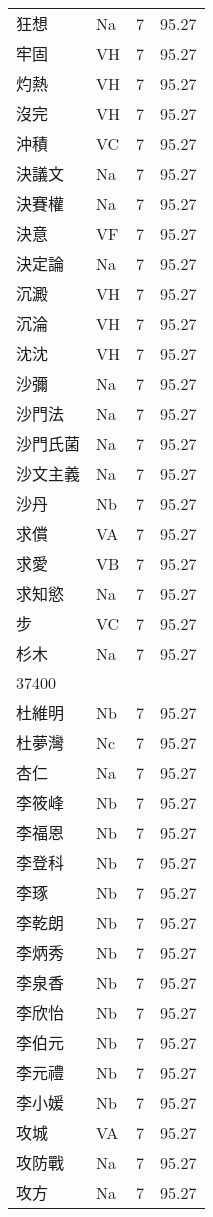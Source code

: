 \documentclass[twocolumn]{book}
\begin{document}
\begin{supertabular}{llrr}
狂想 & Na & 7 &  95.27\\
牢固 & VH & 7 &  95.27\\
灼熱 & VH & 7 &  95.27\\
沒完 & VH & 7 &  95.27\\
沖積 & VC & 7 &  95.27\\
決議文 & Na & 7 &  95.27\\
決賽權 & Na & 7 &  95.27\\
決意 & VF & 7 &  95.27\\
決定論 & Na & 7 &  95.27\\
沉澱 & VH & 7 &  95.27\\
沉淪 & VH & 7 &  95.27\\
沈沈 & VH & 7 &  95.27\\
沙彌 & Na & 7 &  95.27\\
沙門法 & Na & 7 &  95.27\\
沙門氏菌 & Na & 7 &  95.27\\
沙文主義 & Na & 7 &  95.27\\
沙丹 & Nb & 7 &  95.27\\
求償 & VA & 7 &  95.27\\
求愛 & VB & 7 &  95.27\\
求知慾 & Na & 7 &  95.27\\
步 & VC & 7 &  95.27\\
杉木 & Na & 7 &  95.27\\
37400\\
杜維明 & Nb & 7 &  95.27\\
杜夢灣 & Nc & 7 &  95.27\\
杏仁 & Na & 7 &  95.27\\
李筱峰 & Nb & 7 &  95.27\\
李福恩 & Nb & 7 &  95.27\\
李登科 & Nb & 7 &  95.27\\
李琢 & Nb & 7 &  95.27\\
李乾朗 & Nb & 7 &  95.27\\
李炳秀 & Nb & 7 &  95.27\\
李泉香 & Nb & 7 &  95.27\\
李欣怡 & Nb & 7 &  95.27\\
李伯元 & Nb & 7 &  95.27\\
李元禮 & Nb & 7 &  95.27\\
李小媛 & Nb & 7 &  95.27\\
攻城 & VA & 7 &  95.27\\
攻防戰 & Na & 7 &  95.27\\
攻方 & Na & 7 &  95.27\\

\end{supertabular}
\end{document}
